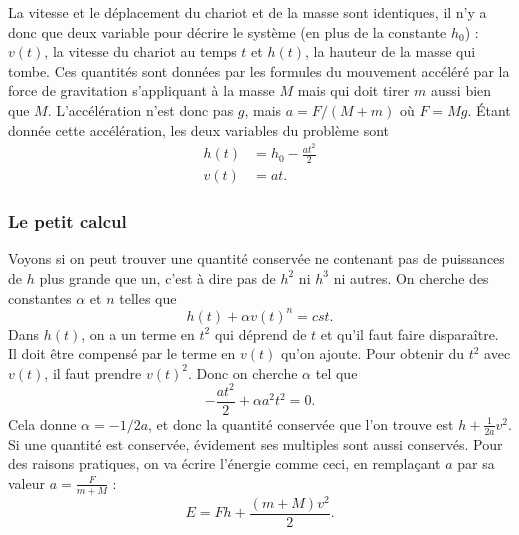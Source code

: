 \documentclass[a4paper,12pt]{book}
\theoremstyle{mes_exemples}	\newtheorem{exemple}[numtho]{Exemple}
\theoremstyle{mes_tho}
\begin{document}
La vitesse et le déplacement du chariot et de la masse sont identiques, il n'y a donc que deux variable pour décrire le système (en plus de la constante $h_0$) : $v(t)$, la vitesse du chariot au temps $t$ et $h(t)$, la hauteur de la masse qui tombe. Ces quantités sont données par les formules du mouvement accéléré par la force de gravitation s'appliquant à la masse $M$ mais qui doit tirer $m$ aussi bien que $M$. L'accélération n'est donc pas $g$, mais $a=F/(M+m)$ où $F=Mg$. Étant donnée cette accélération, les deux variables du problème sont
\begin{subequations}
\begin{align}
  h(t)&=h_0-\frac{ at^2 }{ 2 }\\
	v(t)&=at.
\end{align}
\end{subequations}

\subsubsection{Le petit calcul}

Voyons si on peut trouver une quantité conservée ne contenant pas de puissances de $h$ plus grande que un, c'est à dire pas de $h^2$ ni $h^3$ ni autres. On cherche des constantes $\alpha$ et $n$ telles que
\[ 
  h(t)+\alpha v(t)^n=cst.
\]
Dans $h(t)$, on a un terme en $t^2$ qui déprend de $t$ et qu'il faut faire disparaître. Il doit être compensé par le terme en $v(t)$ qu'on ajoute. Pour obtenir du $t^2$ avec $v(t)$, il faut prendre $v(t)^2$. Donc on cherche $\alpha$ tel que
\[ 
  -\frac{ at^2 }{ 2 }+\alpha a^2t^2=0.
\]
Cela donne $\alpha=-1/2a$, et donc la quantité conservée que l'on trouve est $h+\frac{1}{ 2a }v^2$. Si une quantité est conservée, évidement ses multiples sont aussi conservés. Pour des raisons pratiques, on va écrire l'énergie comme ceci, en remplaçant $a$ par sa valeur $a=\frac{ F }{ m+M }$  :
\begin{equation}  \label{eq_deferg}
    E=Fh+\frac{ (m+M)v^2 }{ 2 }.
\end{equation}
\end{document}
